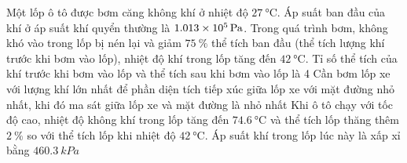 \begin{ex}
	Một lốp ô tô được bơm căng không khí ở nhiệt độ $\SI{27}{\celsius}$. Áp suất ban đầu của khí ở áp suất khí quyển thường là $\SI{1.013E5}{Pa}$. Trong quá trình bơm, không khó vào trong lốp bị nén lại và giảm $\SI{75}{\percent}$ thể tích ban đầu (thể tích lượng khí trước khi bơm vào lốp), nhiệt độ khí trong lốp tăng đến $\SI{42}{\celsius}$.
	{\True Tỉ số thể tích của khí trước khi bơm vào lốp và thể tích sau khi bơm vào lốp là 4}
	{Cần bơm lốp xe với lượng khí lớn nhất để phần diện tích tiếp xúc giữa lốp xe với mặt đường nhỏ nhất, khi đó ma sát giữa lốp xe và mặt đường là nhỏ nhất}
	{\True Khi ô tô chạy với tốc độ cao, nhiệt độ không khí trong lốp tăng đến $\SI{74.6}{\celsius}$ và thể tích lốp thăng thêm $\SI{2}{\percent}$ so với thể tích lốp khi nhiệt độ $\SI{42}{\celsius}$. Áp suất khí trong lốp lúc này là xấp xỉ bằng $\SI{460.3}{kPa}$}
\end{ex}
